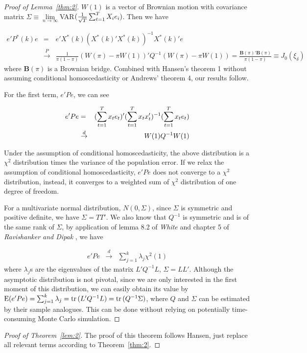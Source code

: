 \begin{proof}[Proof of Lemma~\ref{thm:2}]
\noindent $W(1)$ is a vector of Brownian motion with covariance matrix $\Sigma \equiv \lim\limits_{n\to\infty}$VAR$(\frac{1}{\sqrt{T}}\sum_{t=1}^{T} X_i e_i)$. Then we have

\begin{eqnarray*}
e'P^{*}(k)e & = & e'X^{*}(k)(X^{*}(k)'X^{*}(k))^{-1}X^{*}(k)'e \\
            & \stackrel{P}{\rightarrow} & \frac{1}{\pi(1-\pi)} (W(\pi) - \pi W(1))'Q^{-1}(W(\pi) - \pi W(1)) =  \frac{\mathbf{B}(\pi)'\mathbf{B}(\pi)}{\pi(1-\pi)}\equiv J_0(\xi_{\delta})
\end{eqnarray*}
where $\mathbf{B}(\pi)$ is a Brownian bridge. Combined with Hansen's \cite{hansen2009averaging} theorem 1 without assuming conditional homoscedasticity or Andrews' \cite{andrews93} theorem 4, our results follow.

For the first term, $e'Pe$, we can see

\begin{eqnarray*}
e'Pe & = & (\sum_{t=1}^{T} x_t e_t)'(\sum_{t=1}^{T} x_t x_t')^{-1}(\sum_{t=1}^{T} x_t e_t) \\
     & \stackrel{d}{\rightarrow} & W(1) Q^{-1} W(1)
\end{eqnarray*}

Under the assumption of conditional homoscedasticity, the above distribution is a $\chi^2$ distribution times the variance of the population error. If we relax the assumption of conditional homoscedasticity, $e'Pe$ does not converge to a $\chi^2$ distribution, instead, it converges to a weighted sum of $\chi^2$ distribution of one degree of freedom.

For a multivariate normal distribution, $N(0,\Sigma)$, since $\Sigma$ is symmetric and positive definite, we have $\Sigma = TT'$. We also know that $Q^{-1}$ is symmetric and is of the same rank of $\Sigma$,
by application of lemma 8.2 of \emph{White} \cite{white_mle_textbook} and chapter 5 of \emph{Ravishanker and Dipak} \cite{linear_model_textbook}, we have

\begin{eqnarray*}
e'Pe & \stackrel{d}{\rightarrow} & \sum_{j=1}^{k} \lambda_j \chi^2(1)
\end{eqnarray*}
where $\lambda_j$s are the eigenvalues of the matrix $L'Q^{-1}L$, $\Sigma = LL'$. Although the asymptotic distribution is not pivotal, since we are only interested in the first moment of this distribution, we can easily obtain its value by $\mathrm{E}(e'Pe) = \sum_{j=1}^{k} \lambda_j = \operatorname{tr}{(L'Q^{-1}L)} = \operatorname{tr}{(Q^{-1} \Sigma)}$, where $Q$ and $\Sigma$ can be estimated by their sample analogues. This can be done without relying on potentially time-consuming Monte Carlo simulation.
\end{proof}
\begin{proof}[Proof of Theorem~\ref{lem:2}]
The proof of this theorem follows Hansen\cite{hansen2009averaging}, just replace all relevant terms according to Theorem~\ref{thm:2}.
\end{proof}
